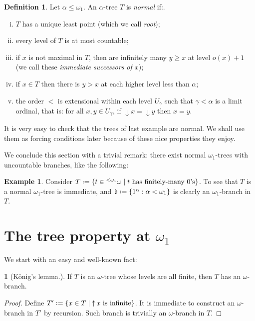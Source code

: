 \documentclass[11pt,a4paper]{report}
\theoremstyle{definition}
\newtheorem{defn}[theorem]{Definition}
\newtheorem{example}[theorem]{Example}
\theoremstyle{num.custom-title}
\newtheorem{teo_custom-title}[theorem]{} %
\theoremstyle{custom-title}
\DeclareMathOperator{\height}{height}
\DeclareMathOperator{\down}{\downarrow}
\DeclareMathOperator{\up}{\uparrow}
\newcommand*{\defeq}{\mathrel{\rlap{%
                     \raisebox{0.3ex}{$\cdot$}}%
                     \raisebox{-0.3ex}{$\cdot$}}%
                     =}
\begin{document}
\begin{defn}
Let $\alpha \leq \omega_1$. An $\alpha$-tree $T$ is \emph{normal} if:.
\begin{enumerate}[(i)]\label{def-normal_tree}
\item $T$ has a unique least point (which we call \emph{root});
\item every level of $T$ is at most countable;
\item if $x$ is not maximal in $T$, then are infinitely many $y \geq x$ at level $o(x)+1$ (we call these \emph{immediate successors of $x$});
\item if $x \in T$ then there is $y>x$ at each higher level less than $\alpha$;
\item the order $<$ is extensional within each level $U_\gamma$ such that $\gamma < \alpha$ is a limit ordinal, that is: for all $x,y \in U_\gamma$, if $\down x = \down y$ then $x=y$.
\end{enumerate}
\end{defn}

It is very easy to check that the trees of last example are normal. We shall use them as forcing conditions later because of these nice properties they enjoy. 

We conclude this section with a trivial remark: there exist normal $\omega_1$-trees with uncountable branches, like the following:

\begin{example}\label{example-non_aronszajn_tree}
Consider $T \defeq \{t \in {}^{<\omega_1} \omega \mid t \text{ has finitely-many $0$'s} \}$. To see that $T$ is a normal $\omega_1$-tree is immediate, and $\mathfrak{b} \defeq \{1^\alpha : \alpha < \omega_1\}$ is clearly an $\omega_1$-branch in $T$.
\end{example}

\section{The tree property at $\omega_1$}

We start with an easy and well-known fact:

\begin{teo_custom-title}[König's lemma.] If $T$ is an $\omega$-tree whose levels are all finite, then $T$ has an $\omega$-branch.
\begin{proof}
Define $T' \defeq \{x \in T \mid \up x \text{ is infinite}\}$. It is immediate to construct an $\omega$-branch in $T'$ by recursion. Such branch is trivially an $\omega$-branch in $T$.
\end{proof}
\end{teo_custom-title}
\end{document}

